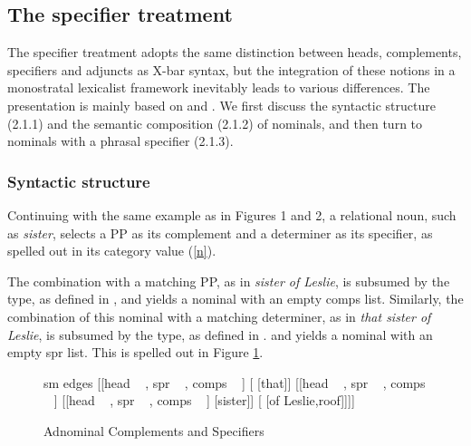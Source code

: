 \documentclass[output=paper]{langsci/langscibook}
\begin{document}
    
\subsection{The specifier treatment} 


The specifier treatment adopts the same distinction between heads, complements, 
specifiers and adjuncts as X-bar syntax, but the integration of these notions 
in a monostratal lexicalist framework inevitably leads to various differences. 
The presentation is mainly based on \citet{ps2} and \citet{GS00}. 
We first discuss the syntactic structure (2.1.1) and the semantic composition (2.1.2) 
of nominals, and then turn to nominals with a phrasal specifier (2.1.3). 


\subsubsection{Syntactic structure}


Continuing with the same example as in Figures 1 and 2, 
a relational noun, such as \emph{sister}, selects a PP as its complement 
and a determiner as its specifier, as spelled out in its {\sc category} value
(\ref{n}). 

\begin{exe} 
\ex\label{n}
\begin{avm}
\end{avm}
\end{exe}

\noindent
The combination with a matching PP, as in \emph{sister of Leslie},   
is subsumed by the  type, as defined in , 
and yields a nominal with an empty {\sc comps} list.  
Similarly, the combination of this nominal with a matching determiner, as in \emph{that sister of Leslie},    
is subsumed by the  type, as defined in . 
and yields a nominal with an empty {\sc spr} list. This is spelled out in Figure \ref{les}. 

\begin{figure}
	\centering
	\begin{forest}
sm edges
[{[{\sc head} ~  , {\sc spr} ~ \eliste, {\sc comps} ~ \eliste]}
		[ [that]]
		[{[{\sc head} ~ , {\sc spr} ~ , {\sc comps} ~ \eliste]} 
			[{[{\sc head} ~ , {\sc spr} ~ , {\sc comps} ~ ]} [sister]]
			[ [of Leslie,roof]]]]	
	\end{forest}
	\caption{\label{les} Adnominal Complements and Specifiers}
\end{figure}
\end{document}
